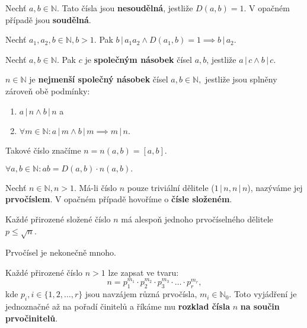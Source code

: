 \begin{definition}
  Nechť $a,b\in \mathbb N.$ Tato čísla jsou \textbf{nesoudělná}, jestliže $D(a,b)=1$. V opačném případě jsou \textbf{soudělná}.
\end{definition}

\begin{veta}
  Nechť $a_1,a_2,b\in \mathbb N, b>1.$ Pak $b \, | \, a_1a_2 \land D(a_1,b)=1\implies b\, | \, a_2.$
\end{veta}

\begin{definition}
  Nechť $a,b\in \mathbb N.$ Pak $c$ je \textbf{společným násobek} čísel $a,b$, jestliže $a \, | \, c \land b\, | \, c.$
\end{definition}

\begin{definition}
  $n\in \mathbb N$ je \textbf{nejmenší společný násobek} čísel $a,b \in \mathbb N,$ jestliže jsou splněny zároveň obě podmínky:
  \begin{enumerate}[$i.$]
    \item $a\, | \, n \land b \, | \, n$ a
    \item $\forall m \in \mathbb N: a \, | \, m \land b \, | \, m \implies m \, | \, n.$
  \end{enumerate}
  Takové číslo značíme $n=n(a,b)=\left [ a,b\right ] .$
\end{definition}

\begin{veta}
  $\forall a,b \in \mathbb N: ab=D(a,b)\cdot n(a,b).$
\end{veta}

\begin{definition}
  Nechť $n\in \mathbb N, n>1.$ Má-li číslo $n$ pouze triviální dělitele ($1 \, | \, n, n \, | \, n$), nazýváme jej \textbf{prvočíslem}. V opačném případě hovoříme o \textbf{čísle složeném}.
\end{definition}

\begin{veta}
  Každé přirozené složené číslo $n$ má alespoň jednoho prvočíselného dělitele $p\leq \sqrt{n}$.
\end{veta}

\begin{veta}
  Prvočísel je nekonečně mnoho.
\end{veta}

\begin{veta}
  Každé přirozené číslo $n>1$ lze zapsat ve tvaru:
  $$n=p_1^{m_1}\cdot p_2^{m_2} \cdot p_3^{m_3}\cdot \hdots \cdot p_r^{m_r},$$
  kde $p_i,i\in\{ 1, 2, \dots, r \}$ jsou navzájem různá prvočísla, $m_i\in \mathbb N_0$. Toto vyjádření je jednoznačné až na pořadí činitelů a říkáme mu \textbf{rozklad čísla} $n$ \textbf{na součin prvočinitelů}.
\end{veta}

